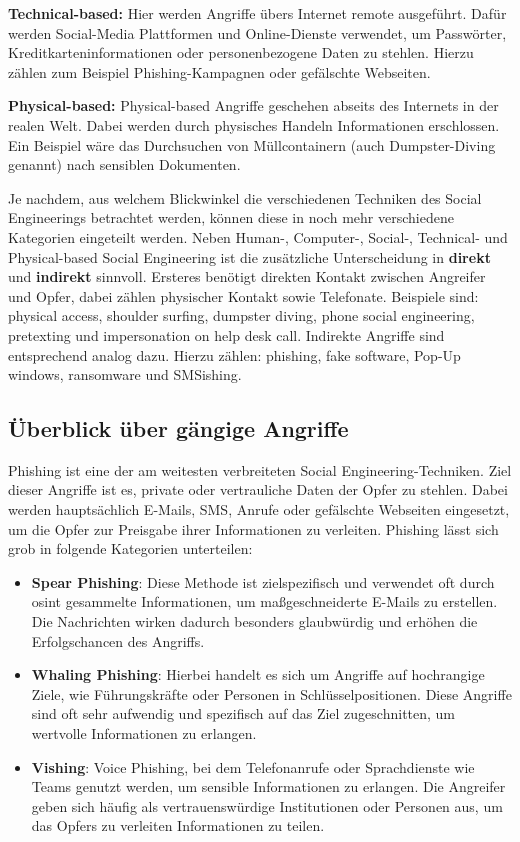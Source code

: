 \textbf{Technical-based:} Hier werden Angriffe übers Internet remote ausgeführt.
Dafür werden Social-Media Plattformen und Online-Dienste verwendet, um Passwörter, Kreditkarteninformationen oder personenbezogene Daten zu stehlen.
Hierzu zählen zum Beispiel Phishing-Kampagnen oder gefälschte Webseiten.

\textbf{Physical-based:} Physical-based Angriffe geschehen abseits des Internets in der realen Welt.
Dabei werden durch physisches Handeln Informationen erschlossen.
Ein Beispiel wäre das Durchsuchen von Müllcontainern (auch Dumpster-Diving genannt) nach sensiblen Dokumenten.

Je nachdem, aus welchem Blickwinkel die verschiedenen Techniken des Social Engineerings betrachtet werden, können diese in noch mehr verschiedene Kategorien eingeteilt werden.
Neben Human-, Computer-, Social-, Technical- und Physical-based Social Engineering ist die zusätzliche Unterscheidung in \textbf{direkt} und \textbf{indirekt} sinnvoll.
Ersteres benötigt direkten Kontakt zwischen Angreifer und Opfer, dabei zählen physischer Kontakt sowie Telefonate.
Beispiele sind: physical access, shoulder surfing, dumpster diving, phone social engineering, pretexting und impersonation on help desk call.
Indirekte Angriffe sind entsprechend analog dazu.
Hierzu zählen: phishing, fake software, Pop-Up windows, ransomware und SMSishing.

\subsection{Überblick über gängige Angriffe}\label{subsec:uberblick-uber-gangige-angriffe}
Phishing ist eine der am weitesten verbreiteten Social Engineering-Techniken.
Ziel dieser Angriffe ist es, private oder vertrauliche Daten der Opfer zu stehlen.
Dabei werden hauptsächlich E-Mails, SMS, Anrufe oder gefälschte Webseiten eingesetzt, um die Opfer zur Preisgabe ihrer Informationen zu verleiten.
Phishing lässt sich grob in folgende Kategorien unterteilen\cite{advanced-social-engineering-attacks}:
\begin{itemize}
    \item \textbf{Spear Phishing}: Diese Methode ist zielspezifisch und verwendet oft durch \gls{osint} gesammelte Informationen, um maßgeschneiderte E-Mails zu erstellen.
    Die Nachrichten wirken dadurch besonders glaubwürdig und erhöhen die Erfolgschancen des Angriffs.
    \item \textbf{Whaling Phishing}: Hierbei handelt es sich um Angriffe auf hochrangige Ziele, wie Führungskräfte oder Personen in Schlüsselpositionen.
    Diese Angriffe sind oft sehr aufwendig und spezifisch auf das Ziel zugeschnitten, um wertvolle Informationen zu erlangen.
    \item \textbf{Vishing}: Voice Phishing, bei dem Telefonanrufe oder Sprachdienste wie Teams genutzt werden, um sensible Informationen zu erlangen.
    Die Angreifer geben sich häufig als vertrauenswürdige Institutionen oder Personen aus, um das Opfers zu verleiten Informationen zu teilen.
\end{itemize}

